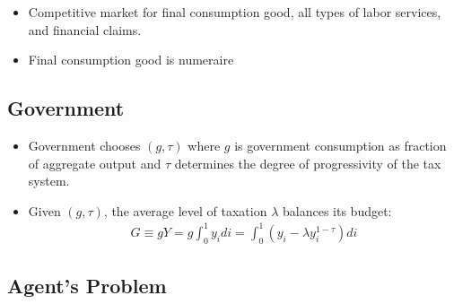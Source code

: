 \documentclass{article}
\begin{document}
\begin{itemize}
\item Competitive market for final consumption good, all types of labor services, and financial claims.
\item Final consumption good is numeraire
\end{itemize}



\subsection{Government}



\begin{itemize}
\item Government chooses $(g,\tau)$ where $g$ is government consumption as fraction of aggregate output and $\tau$ determines the degree of progressivity of the tax system.
\item Given $(g, \tau)$, the average level of taxation $\lambda$ balances its budget:
\begin{align}
G \equiv gY = g \int_0^1 y_i di = \int_0^1 (y_i - \lambda y_i^{1-\tau}) di \label{gbc}
\end{align}
\end{itemize}



\subsection{Agent's Problem}
\end{document}
